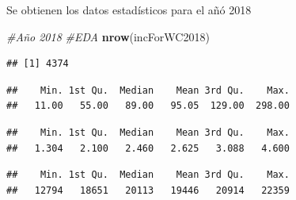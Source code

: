 \documentclass[11pt,]{article}
\newenvironment{Shaded}{\begin{snugshade}}{\end{snugshade}}
\newcommand{\KeywordTok}[1]{\textcolor[rgb]{0.13,0.29,0.53}{\textbf{#1}}}
\newcommand{\CommentTok}[1]{\textcolor[rgb]{0.56,0.35,0.01}{\textit{#1}}}
\newcommand{\OperatorTok}[1]{\textcolor[rgb]{0.81,0.36,0.00}{\textbf{#1}}}
\newcommand{\NormalTok}[1]{#1}
\begin{document}
Se obtienen los datos estadísticos para el añó 2018

\begin{Shaded}
\begin{Highlighting}[]
\CommentTok{#Año 2018}
\CommentTok{#EDA}
\KeywordTok{nrow}\NormalTok{(incForWC2018)}
\end{Highlighting}
\end{Shaded}

\begin{verbatim}
## [1] 4374
\end{verbatim}

\begin{Shaded}
\end{Shaded}

\begin{verbatim}
##    Min. 1st Qu.  Median    Mean 3rd Qu.    Max. 
##   11.00   55.00   89.00   95.05  129.00  298.00
\end{verbatim}

\begin{Shaded}
\end{Shaded}

\begin{verbatim}
##    Min. 1st Qu.  Median    Mean 3rd Qu.    Max. 
##   1.304   2.100   2.460   2.625   3.088   4.600
\end{verbatim}

\begin{Shaded}
\end{Shaded}

\begin{verbatim}
##    Min. 1st Qu.  Median    Mean 3rd Qu.    Max. 
##   12794   18651   20113   19446   20914   22359
\end{verbatim}

\begin{Shaded}
\end{Shaded}
\end{document}
